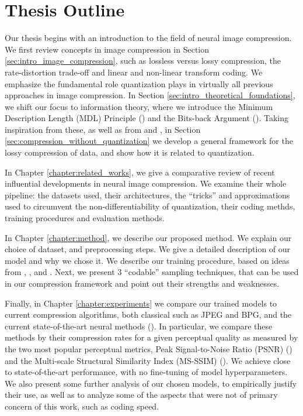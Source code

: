 \section{Thesis Outline}
\par 
Our thesis begins with an introduction to the field of neural image compression.
We first review concepts in image compression in Section
\ref{sec:intro_image_compression}, such as lossless versus lossy
compression, the rate-distortion trade-off and linear and non-linear transform
coding. We emphasize the fundamental role quantization plays in virtually all
previous approaches in image compression. In Section
\ref{sec:intro_theoretical_foundations}, we shift our focus to information
theory, where we introduce the Minimum Description Length (MDL) Principle
(\cite{rissanen1981universal}) and the Bits-back Argument
(\cite{hinton1993keeping}). Taking inspiration from these, as well as from
\cite{harsha2007communication} and \cite{havasi2018minimal}, in Section
\ref{sec:compression_without_quantization}
we develop a general framework for the lossy compression of data, and show how
it is related to quantization.

\par
In Chapter \ref{chapter:related_works}, we give a comparative review of recent
influential developments in neural image compression. We examine their whole
pipeline: the datasets used, their architectures, the ``tricks'' and
approximations used to circumvent the non-differentiability of quantization,
their coding methds, training procedures and evaluation methods.

\par
In Chapter \ref{chapter:method}, we describe our proposed method. We explain our
choice of dataset, and preprocessing steps. We give a detailed description of
our model and why we chose it. We describe our
training procedure, based on ideas from \cite{sonderby2016train},
\cite{higgins2017beta}, \cite{balle2018variational} and \cite{dai2019diagnosing}.
Next, we present 3 ``codable'' sampling techniques, that can be used in our
compression framework and point out their strengths and weaknesses.

\par
Finally, in Chapter \ref{chapter:experiments} we compare our trained models to
current compression algorithms, both classical such as JPEG and BPG, and
the current state-of-the-art neural methods (\cite{balle2018variational}). In
particular, we compare these methods by their compression rates for a given
perceptual quality as measured by the two most popular perceptual metrics, Peak
Signal-to-Noise Ratio (PSNR) (\cite{psnr}) and the Multi-scale Structural
Similarity Index (MS-SSIM) (\cite{msssim}). We achieve close to
state-of-the-art performance, with no fine-tuning of model hyperparameters.
We also present some further analysis of our chosen models, to empirically
justify their use, as well as to analyze some of the aspects that were not of
primary concern of this work, such as coding speed.
